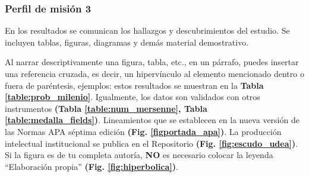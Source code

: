\subsubsection{Perfil de misión 3}  


En los resultados se comunican los hallazgos y descubrimientos del estudio. Se incluyen tablas, figuras, diagramas y demás material demostrativo.




 Al narrar descriptivamente una figura, tabla, etc., en un párrafo, puedes insertar una referencia cruzada, es decir, un hipervínculo al elemento mencionado dentro o fuera de paréntesis, ejemplos: estos resultados se muestran en la \textbf{Tabla \ref{table:prob_milenio}}.  Igualmente, los datos son validados con otros instrumentos \textbf{(Tabla \ref{table:num_mersenne}, Tabla \ref{table:medalla_fields})}. Lineamientos que se establecen en la nueva versión de las Normas APA séptima edición \textbf{(Fig. \ref{figportada_apa})}. La producción intelectual institucional se publica en el Repositorio \textbf{(Fig. \ref{fig:escudo_udea})}. Si la figura es de tu completa autoría, \textbf{NO} es necesario colocar la leyenda “Elaboración propia” \textbf{(Fig. \ref{fig:hiperbolica})}.



